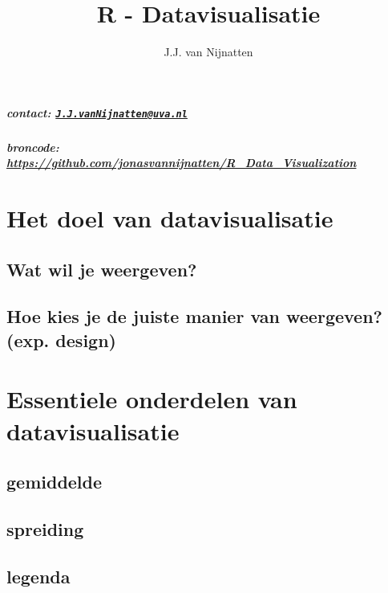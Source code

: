 \documentclass[]{article}
\title{R - Datavisualisatie}
\author{J.J. van Nijnatten}
\date{}
\let\oldsubparagraph\subparagraph
\renewcommand{\subparagraph}[1]{\oldsubparagraph{#1}\mbox{}}
\begin{document}
\maketitle

{
\setcounter{tocdepth}{2}
\tableofcontents
}
\subparagraph{\texorpdfstring{contact:
\href{mailto:J.J.vanNijnatten@uva.nl}{\nolinkurl{J.J.vanNijnatten@uva.nl}}}{contact: J.J.vanNijnatten@uva.nl}}\label{contact-j.j.vannijnattenuva.nl}

\subparagraph{\texorpdfstring{broncode:
\url{https://github.com/jonasvannijnatten/R_Data_Visualization}}{broncode: https://github.com/jonasvannijnatten/R\_Data\_Visualization}}\label{broncode-httpsgithub.comjonasvannijnattenr_data_visualization}

\section{Het doel van
datavisualisatie}\label{het-doel-van-datavisualisatie}

\subsection{Wat wil je weergeven?}\label{wat-wil-je-weergeven}

\subsection{Hoe kies je de juiste manier van weergeven? (exp.
design)}\label{hoe-kies-je-de-juiste-manier-van-weergeven-exp.-design}

\section{Essentiele onderdelen van
datavisualisatie}\label{essentiele-onderdelen-van-datavisualisatie}

\subsection{gemiddelde}\label{gemiddelde}

\subsection{spreiding}\label{spreiding}

\subsection{legenda}\label{legenda}
\end{document}

